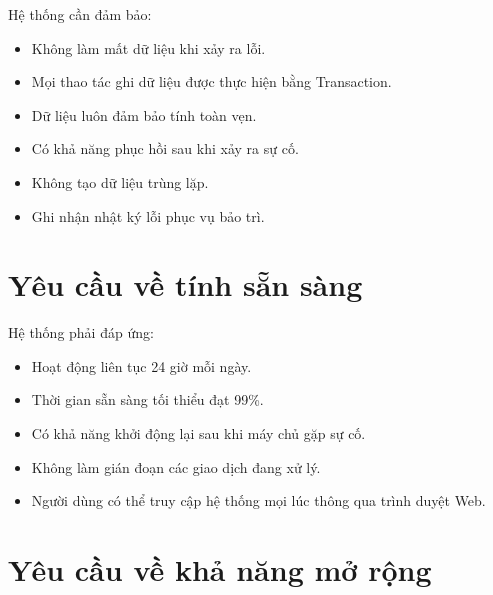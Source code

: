 Hệ thống cần đảm bảo:

\begin{itemize}

\item Không làm mất dữ liệu khi xảy ra lỗi.

\item Mọi thao tác ghi dữ liệu được thực hiện bằng Transaction.

\item Dữ liệu luôn đảm bảo tính toàn vẹn.

\item Có khả năng phục hồi sau khi xảy ra sự cố.

\item Không tạo dữ liệu trùng lặp.

\item Ghi nhận nhật ký lỗi phục vụ bảo trì.

\end{itemize}


\section{Yêu cầu về tính sẵn sàng}

Hệ thống phải đáp ứng:

\begin{itemize}

\item Hoạt động liên tục 24 giờ mỗi ngày.

\item Thời gian sẵn sàng tối thiểu đạt 99\%.

\item Có khả năng khởi động lại sau khi máy chủ gặp sự cố.

\item Không làm gián đoạn các giao dịch đang xử lý.

\item Người dùng có thể truy cập hệ thống mọi lúc thông qua trình duyệt Web.

\end{itemize}


\section{Yêu cầu về khả năng mở rộng}

